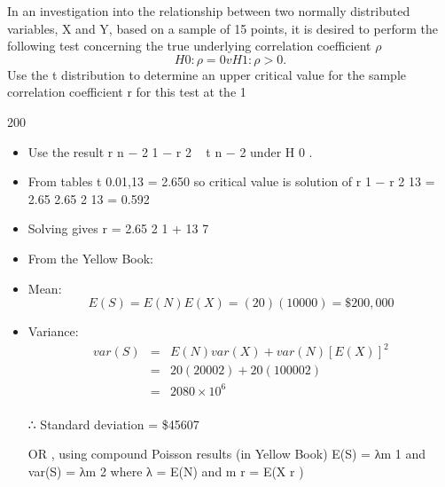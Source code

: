\documentclass[a4paper,12pt]{article}
\begin{document}
In an investigation into the relationship between two normally distributed variables, X
and Y, based on a sample of 15 points, it is desired to perform the following test
concerning the true underlying correlation coefficient $\rho$
\[H 0 : \rho = 0 v H 1 : \rho > 0.\]
Use the t distribution to determine an upper critical value for the sample correlation
coefficient r for this test at the 1%

200
\begin{itemize}

\item Use the result
r n − 2
1 − r 2
~ t n − 2 under H 0 .
\item From tables t 0.01,13 = 2.650
so critical value is solution of
r
1 − r 2
13 = 2.65
2.65 2
13
= 0.592
\item Solving gives r =
2.65 2
1 +
13
7
\item From the Yellow Book:
\item Mean:
\[E(S) = E(N)E(X) = (20)(10000) = \$200,000\]
\item Variance: 
\begin{eqnarray*}var(S) &=& E(N) var(X) + var(N)[E(X)]^2\\
&=& 20(2000 2 ) + 20(10000 2 ) \\ &=& 2080 × 10^6\\
\end{eqnarray*}

∴ Standard deviation = \$45607
\item [ OR , using compound Poisson results (in Yellow Book)
E(S) = λm 1 and var(S) = λm 2 where λ = E(N) and m r = E(X r )]
\end{itemize}
\end{document}
